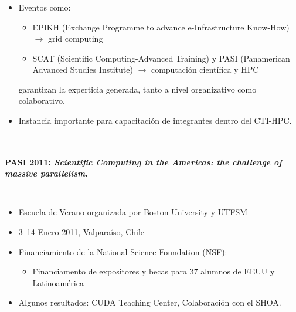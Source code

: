 \frame
{
\frametitle{}


\begin{columns}
\begin{itemize}
\item Eventos como:
\begin{itemize} 
\item  EPIKH (Exchange Programme to advance e-Infrastructure Know-How) $\rightarrow$ grid computing
\item SCAT (Scientific Computing-Advanced Training) y PASI (Panamerican Advanced Studies Institute) $\rightarrow$ computaci\'{o}n cient\'{i}fica y HPC
\end{itemize} 
garantizan 
la experticia generada, tanto a nivel organizativo como colaborativo. 
\item Instancia importante para capacitación de integrantes dentro del CTI-HPC. 
\end{itemize}
\end{columns}
}


\frame
{
\frametitle{}
\framesubtitle{PASI 2011: \emph{Scientific Computing in the Americas: the challenge of massive parallelism}.}

\begin{columns}
\begin{itemize}
\item  Escuela de Verano organizada por Boston University y  UTFSM
\item 3–14 Enero  2011, Valpara\'{i}so, Chile
\item Financiamiento de la National Science Foundation (NSF):
        \begin{itemize}
        \item Financiamento de expositores y becas para 37 alumnos de EEUU y
Latinoamérica
        \end{itemize}
\item Algunos resultados: CUDA Teaching Center, Colaboración con el SHOA.
\end{itemize}
\end{columns}

}




